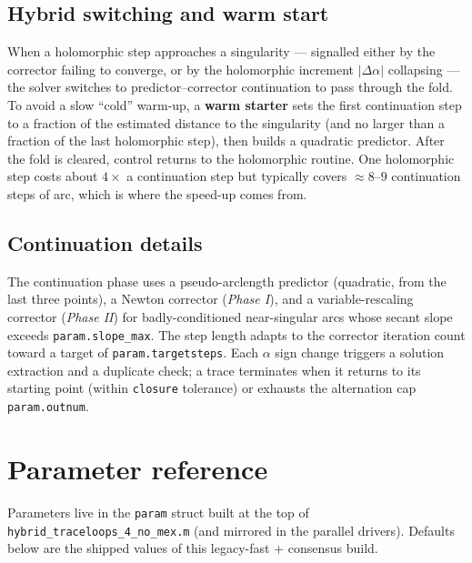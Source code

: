 \documentclass[11pt,a4paper]{article}
\newcommand{\code}[1]{\texttt{#1}}
\begin{document}
\subsection{Hybrid switching and warm start}
When a holomorphic step approaches a singularity --- signalled either by the corrector
failing to converge, or by the holomorphic increment $|\Delta\alpha|$ collapsing --- the
solver switches to predictor--corrector continuation to pass through the fold. To avoid a
slow ``cold'' warm-up, a \textbf{warm starter} sets the first continuation step to a
fraction of the estimated distance to the singularity (and no larger than a fraction of
the last holomorphic step), then builds a quadratic predictor. After the fold is cleared,
control returns to the holomorphic routine. One holomorphic step costs about
$4\times$ a continuation step but typically covers $\approx 8$--$9$ continuation steps of
arc, which is where the speed-up comes from.

\subsection{Continuation details}
The continuation phase uses a pseudo-arclength predictor (quadratic, from the last three
points), a Newton corrector (\emph{Phase I}), and a variable-rescaling corrector
(\emph{Phase II}) for badly-conditioned near-singular arcs whose secant slope exceeds
\code{param.slope_max}. The step length adapts to the corrector iteration count toward a
target of \code{param.targetsteps}. Each $\alpha$ sign change triggers a solution
extraction and a duplicate check; a trace terminates when it returns to its starting
point (within \code{closure} tolerance) or exhausts the alternation cap
\code{param.outnum}.

\section{Parameter reference}

Parameters live in the \code{param} struct built at the top of
\code{hybrid_traceloops_4_no_mex.m} (and mirrored in the parallel drivers). Defaults
below are the shipped values of this legacy-fast + consensus build.
\end{document}
